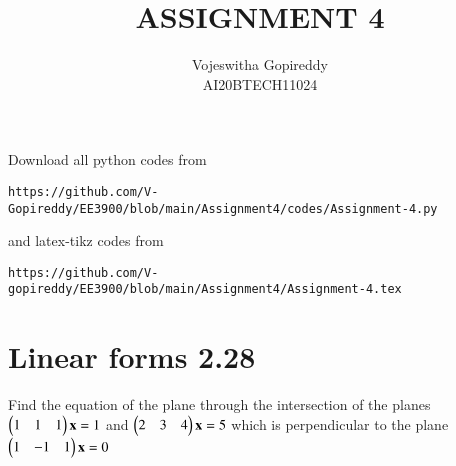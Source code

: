 \documentclass[journal,12pt,twocolumn]{IEEEtran}
\begin{document}
     \def\centbox#1{\makebox[0in]{#1}}
     \def\topbox#1{\raisebox{-\baselineskip}[0in][0in]{#1}}
     \def\midbox#1{\raisebox{-0.5\baselineskip}[0in][0in]{#1}}
\vspace{3cm}
\title{ASSIGNMENT 4}
\author{Vojeswitha Gopireddy \\ AI20BTECH11024}
\maketitle
\newpage
\bigskip
\renewcommand{\thefigure}{\theenumi}
\renewcommand{\thetable}{\theenumi}
Download all python codes from 
\begin{lstlisting}
https://github.com/V-Gopireddy/EE3900/blob/main/Assignment4/codes/Assignment-4.py
\end{lstlisting}
%
and latex-tikz codes from 
%
\begin{lstlisting}
https://github.com/V-gopireddy/EE3900/blob/main/Assignment4/Assignment-4.tex
\end{lstlisting}
\section{Linear forms 2.28}
Find the equation of the plane through the intersection of the planes $\begin{pmatrix}1&1&1\end{pmatrix}\mathbf{x} = 1$ and $\begin{pmatrix}2&3&4\end{pmatrix}\mathbf{x} = 5$ which is perpendicular to the plane $\begin{pmatrix}1&-1&1\end{pmatrix}\mathbf{x} = 0$
%
\end{document}
